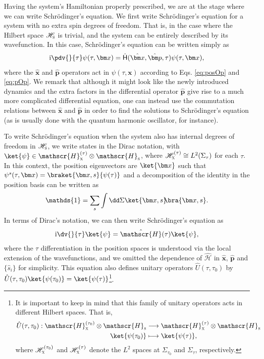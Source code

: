 \documentclass[letterpaper,12pt,titlepage,oneside,final]{book}
\newcommand{\openone}{\mathds{1}}
\newcommand{\ii}{\mathrm{i}}
\begin{document}
Having the system's Hamiltonian properly prescribed, we are at the stage where we can write Schr\"odinger's equation. We first write Schr\"odinger's equation for a system with no extra spin degrees of freedom. That is, in the case where the Hilbert space $\mathscr{H}_\textsc{s}$ is trivial, and the system can be entirely described by its wavefunction. In this case, Schr\"odinger's equation can be written simply as
\begin{equation}
    \ii\pdv{}{\tau}\psi(\tau,\bm x) =\hat{\mathsf{H}}(\hat{\bm x},\hat{\bm p},\tau)\psi(\tau,\bm x),
\end{equation}
where the $\hat{\bm x}$ and $\hat{\bm p}$ operators act in $\psi(\tau,\bm x)$ according to Eqs. \eqref{eq:posOp} and \eqref{eq:pOp}. We remark that although it might look like the newly introduced dynamics and the extra factors in the differential operator $\hat{\bm p}$ give rise to a much more complicated differential equation, one can instead use the commutation relations between $\hat{\bm x}$ and $\hat{\bm p}$ in order to find the solutions to Schr\"odinger's equation (as is usually done with the quantum harmonic oscillator, for instance).

To write Schr\"odinger's equation when the system also has internal degrees of freedom in $\mathscr{H}_\textsc{s}$, we write states in the Dirac notation, with \mbox{$\ket{\psi}\in \mathscr{H}^{(\tau)}_{\textsc{x}}\otimes \mathscr{H}_\textsc{s}$}, where $\mathscr{H}^{(\tau)}_{\textsc{x}}\cong L^2(\Sigma_\tau)$ for each $\tau$. In this context, the position eigenvectors are $\ket{\bm x}$ such that $\psi^s(\tau,\bm x) = \braket{\bm x,s}{\psi(\tau)}$ and a decomposition of the identity in the position basis can be written as
\begin{equation}\label{eq:idDecomp}
    \openone = \sum_s \int \dd \Sigma \ket{\bm x,s}\!\!\bra{\bm x,s}.
\end{equation}
In terms of Dirac's notation, we can then write Schr\"odinger's equation as
\begin{equation}
    \ii \dv{}{\tau}\ket{\psi} = \hat{\mathscr{H}}(\tau) \ket{\psi},
\end{equation}
where the $\tau$ differentiation in the position spaces is understood via the local extension of the wavefunctions, and we omitted the dependence of $\hat{\mathscr{H}}$ in $\hat{\bm x}$, $\hat{\bm p}$ and $\{\hat{s}_i\}$ for simplicity. This equation also defines unitary operators $\hat{U}(\tau,\tau_0)$ by $\hat{U}(\tau,\tau_0)\ket{\psi(\tau_0)} = \ket{\psi(\tau)}$\footnote{It is important to keep in mind that this family of unitary operators acts in different Hilbert spaces. That is,
\begin{align}
    \hat{U}(\tau,\tau_0): \mathscr{H}^{(\tau_0)}_{\textsc{x}}\otimes \mathscr{H}_\textsc{s}&\longrightarrow  \mathscr{H}^{(\tau)}_{\textsc{x}}\otimes \mathscr{H}_\textsc{s}\\
    \:\:\:\:\ket{\psi(\tau_0)}&\longmapsto \ket{\psi(\tau)},\nonumber
\end{align}
where $\mathscr{H}^{(\tau_0)}_{\textsc{x}}$ and $\mathscr{H}^{(\tau)}_{\textsc{x}}$ denote the $L^2$ spaces at $\Sigma_{\tau_0}$ and $\Sigma_\tau$, respectively.}.
\end{document}
